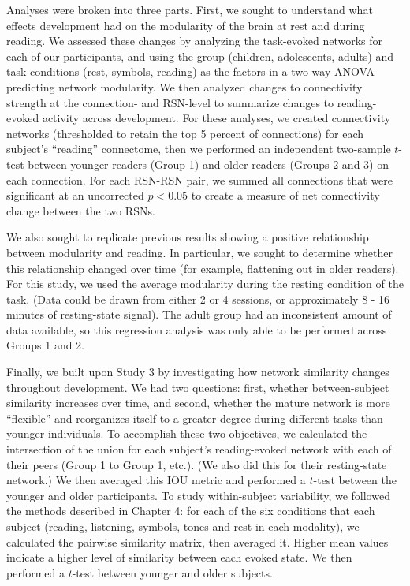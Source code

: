 Analyses were broken into three parts. First, we sought to understand what effects development had on the modularity of the brain at rest and during reading. We assessed these changes by analyzing the task-evoked networks for each of our participants, and using the group (children, adolescents, adults) and task conditions (rest, symbols, reading) as the factors in a two-way ANOVA predicting network modularity. We then analyzed changes to connectivity strength at the connection- and RSN-level to summarize changes to reading-evoked activity across development. For these analyses, we created connectivity networks (thresholded to retain the top 5 percent of connections) for each subject's ``reading'' connectome, then we performed an independent two-sample $t$-test between younger readers (Group 1) and older readers (Groups 2 and 3) on each connection. For each RSN-RSN pair, we summed all connections that were significant at an uncorrected $p < 0.05$ to create a measure of net connectivity change between the two RSNs.

We also sought to replicate previous results showing a positive relationship between modularity and reading. In particular, we sought to determine whether this relationship changed over time (for example, flattening out in older readers). For this study, we used the average modularity during the resting condition of the task. (Data could be drawn from either 2 or 4 sessions, or approximately 8 - 16 minutes of resting-state signal). The adult group had an inconsistent amount of data available, so this regression analysis was only able to be performed across Groups 1 and 2.

Finally, we built upon Study 3 by investigating how network similarity changes throughout development. We had two questions: first, whether between-subject similarity increases over time, and second, whether the mature network is more ``flexible'' and reorganizes itself to a greater degree during different tasks than younger individuals. To accomplish these two objectives, we calculated the intersection of the union for each subject's reading-evoked network with each of their peers (Group 1 to Group 1, etc.). (We also did this for their resting-state network.) We then averaged this IOU metric and performed a $t$-test between the younger and older participants. To study within-subject variability, we followed the methods described in Chapter 4: for each of the six conditions that each subject (reading, listening, symbols, tones and rest in each modality), we calculated the pairwise similarity matrix, then averaged it. Higher mean values indicate a higher level of similarity between each evoked state. We then performed a $t$-test between younger and older subjects.


